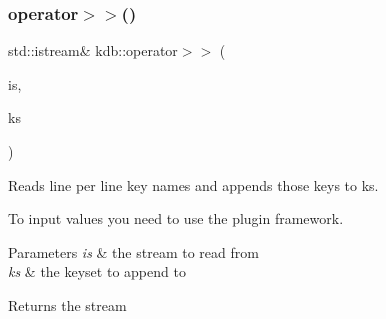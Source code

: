 \subsubsection{\texorpdfstring{operator$>$$>$()}{operator>>()}\hspace{0.1cm}{\footnotesize\ttfamily [2/2]}}
{\footnotesize\ttfamily std\+::istream\& kdb\+::operator$>$$>$ (\begin{DoxyParamCaption}\item[{std\+::istream \&}]{is,  }\item[{\mbox{\hyperlink{classkdb_1_1KeySet}{kdb\+::\+Key\+Set}} \&}]{ks }\end{DoxyParamCaption})\hspace{0.3cm}{\ttfamily [inline]}}



Reads line per line key names and appends those keys to ks. 

To input values you need to use the plugin framework.


\begin{DoxyParams}{Parameters}
{\em is} & the stream to read from \\
\hline
{\em ks} & the keyset to append to\\
\hline
\end{DoxyParams}
\begin{DoxyReturn}{Returns}
the stream 
\end{DoxyReturn}
